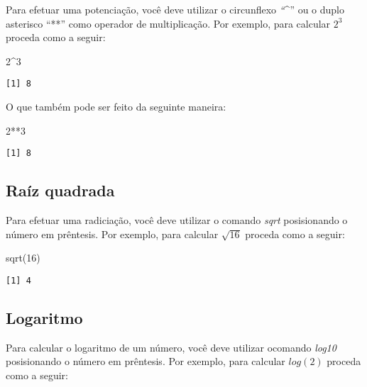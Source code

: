 \documentclass[
  letterpaper,
  DIV=11,
  numbers=noendperiod]{scrreprt}
\newenvironment{Shaded}{\begin{snugshade}}{\end{snugshade}}
\newcommand{\DecValTok}[1]{\textcolor[rgb]{0.68,0.00,0.00}{#1}}
\newcommand{\FunctionTok}[1]{\textcolor[rgb]{0.28,0.35,0.67}{#1}}
\newcommand{\NormalTok}[1]{\textcolor[rgb]{0.00,0.23,0.31}{#1}}
\newcommand{\SpecialCharTok}[1]{\textcolor[rgb]{0.37,0.37,0.37}{#1}}
\begin{document}
Para efetuar uma potenciação, você deve utilizar o circunflexo
\emph{``}\^{}'' ou o duplo asterisco ``**'' como operador de
multiplicação. Por exemplo, para calcular \(2^3\) proceda como a seguir:

\begin{Shaded}
\begin{Highlighting}[]
\DecValTok{2}\SpecialCharTok{\^{}}\DecValTok{3}
\end{Highlighting}
\end{Shaded}

\begin{verbatim}
[1] 8
\end{verbatim}

O que também pode ser feito da seguinte maneira:

\begin{Shaded}
\begin{Highlighting}[]
\DecValTok{2}\SpecialCharTok{**}\DecValTok{3}
\end{Highlighting}
\end{Shaded}

\begin{verbatim}
[1] 8
\end{verbatim}

\subsection{Raíz quadrada}\label{rauxedz-quadrada}

Para efetuar uma radiciação, você deve utilizar o comando \emph{sqrt}
posisionando o número em prêntesis. Por exemplo, para calcular
\(\sqrt{16}\) proceda como a seguir:

\begin{Shaded}
\begin{Highlighting}[]
\FunctionTok{sqrt}\NormalTok{(}\DecValTok{16}\NormalTok{)}
\end{Highlighting}
\end{Shaded}

\begin{verbatim}
[1] 4
\end{verbatim}

\subsection{Logaritmo}\label{logaritmo}

Para calcular o logaritmo de um número, você deve utilizar ocomando
\emph{log10} posisionando o número em prêntesis. Por exemplo, para
calcular \(log(2)\) proceda como a seguir:
\end{document}
